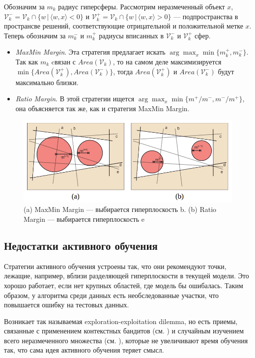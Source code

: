 \documentclass[specialist, 12pt, href]{article}
\begin{document}
Обозначим за \(m_k\) радиус гиперсферы. Рассмотрим неразмеченный объект
\(x\), 
\(\mathcal{V}_k^- = \mathcal{V}_k \cap \{w\,|\, \langle w, x\rangle < 0\}\)
и
\(\mathcal{V}_k^+ = \mathcal{V}_k \cap \{w\,|\, \langle w, x\rangle > 0\}\) --- подпространства в
пространсве решений, соответствующие отрицательной и положительной метке
\(x\). Теперь обозначим за \(m^-_k\) и \(m^+_k\) радиусы вписанных в
\(\mathcal{V}_k^-\) и \(\mathcal{V}_k^+\) сфер.


\begin{itemize}
\item
  \emph{MaxMin Margin}. Эта стратегия предлагает искать
  \(\arg\max_x \min\{m^+_k, m^-_k\}\). Так как \(m_k\) cвязан с
  \(Area(\mathcal{V}_k)\), то на самом деле максимизируется
  \(\min\{Area(\mathcal{V}_k^+), Area(\mathcal{V}^-_k)\}\), тогда
  \(Area(\mathcal{V}_k^+)\) и \(Area(\mathcal{V}^-_k)\) будут
  максимально близки.
\item
  \emph{Ratio Margin}. В этой стратегии ищется
  \(\arg\max_x \min\{m^+/m^-, m^-/m^+\}\), она объясняется так же, как и
  стратегия MaxMin Margin.
\end{itemize}

\begin{figure}[htbp]
\centering
\includegraphics[width=5in]{img/maxminmargin.png}
\caption{(a) MaxMin Margin --- выбирается гиперплоскость b. (b)
Ratio Margin --- выбирается гиперплоскость e}
\end{figure}

\subsection{Недостатки активного
обучения}

Стратегии активного обучения устроены так, что они рекомендуют точки,
лежащие, например, вблизи разделяющей гиперплоскости в текущей модели.
Это хорошо работает, если нет крупных областей, где модель бы ошибалась.
Таким образом, у алгоритма среди данных есть необследованные участки,
что повышается ошибку на тестовых данных.

Возникает так называемая exploration-exploitation dilemma, но есть
приемы, связанные с применением контекстных бандитов (см. \cite{Bouneffouf1}) и случайным изучением всего неразмеченного множества (см.
\cite{Bouneffouf2}), которые не увеличивают время обучения так, что сама
идея активного обучения теряет смысл.



\end{document}
